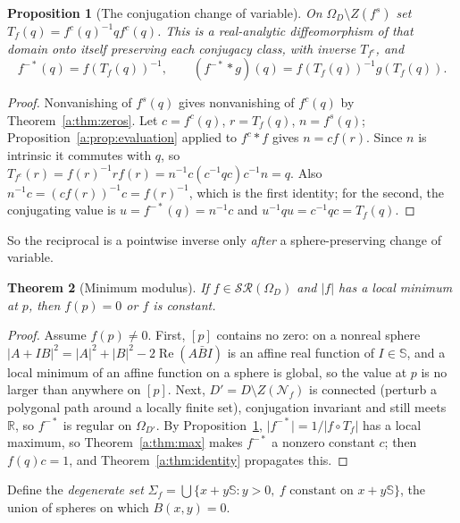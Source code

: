 \documentclass[11pt,a4paper]{article}
\numberwithin{equation}{section}
\newtheorem{theorem}{Theorem}[section]
\newtheorem{proposition}[theorem]{Proposition}
\theoremstyle{definition}
\theoremstyle{remark}
\theoremstyle{plain}
\newcommand{\RR}{\mathbb R}
\newcommand{\SSS}{\mathbb S}
\DeclareMathOperator{\Rea}{Re}
\newcommand{\SR}{\mathcal{SR}}
\newcommand{\Om}{\Omega}
\newcommand{\abs}[1]{\lvert #1\rvert}
\begin{document}
\begin{proposition}[The conjugation change of variable]
\label{a:prop:T}
On $\Om_D\setminus Z(f^s)$ set $T_f(q)=f^c(q)^{-1}qf^c(q)$. This is a
real-analytic diffeomorphism of that domain onto itself preserving each
conjugacy class, with inverse $T_{f^c}$, and
\begin{equation}
 f^{-*}(q)=f(T_f(q))^{-1},\qquad
 (f^{-*}*g)(q)=f(T_f(q))^{-1}g(T_f(q)).
 \label{a:eq:quotient-eval}
\end{equation}
\end{proposition}

\begin{proof}
Nonvanishing of $f^s(q)$ gives nonvanishing of $f^c(q)$ by
Theorem~\ref{a:thm:zeros}. Let $c=f^c(q)$, $r=T_f(q)$, $n=f^s(q)$;
Proposition~\ref{a:prop:evaluation} applied to $f^c*f$ gives $n=cf(r)$. Since
$n$ is intrinsic it commutes with $q$, so
$T_{f^c}(r)=f(r)^{-1}rf(r)=n^{-1}c(c^{-1}qc)c^{-1}n=q$. Also
$n^{-1}c=(cf(r))^{-1}c=f(r)^{-1}$, which is the first identity; for the
second, the conjugating value is $u=f^{-*}(q)=n^{-1}c$ and
$u^{-1}qu=c^{-1}qc=T_f(q)$.
\end{proof}

So the reciprocal is a pointwise inverse only \emph{after} a
sphere-preserving change of variable.

\begin{theorem}[Minimum modulus]
\label{a:thm:min}
If $f\in\SR(\Om_D)$ and $\abs f$ has a local minimum at $p$, then $f(p)=0$ or
$f$ is constant.
\end{theorem}

\begin{proof}
Assume $f(p)\ne0$. First, $[p]$ contains no zero: on a nonreal sphere
$\abs{A+IB}^2=\abs A^2+\abs B^2-2\Rea(A\bar BI)$ is an affine real function of
$I\in\SSS$, and a local minimum of an affine function on a sphere is global,
so the value at $p$ is no larger than anywhere on $[p]$. Next,
$D'=D\setminus Z(\mathcal N_f)$ is connected (perturb a polygonal path around
a locally finite set), conjugation invariant and still meets $\RR$, so
$f^{-*}$ is regular on $\Om_{D'}$. By Proposition~\ref{a:prop:T},
$\abs{f^{-*}}=1/\abs{f\circ T_f}$ has a local maximum, so
Theorem~\ref{a:thm:max} makes $f^{-*}$ a nonzero constant $c$; then
$f(q)c=1$, and Theorem~\ref{a:thm:identity} propagates this.
\end{proof}

Define the \emph{degenerate set}
$\Sigma_f=\bigcup\{x+y\SSS: y>0,\ f\text{ constant on }x+y\SSS\}$, the union
of spheres on which $B(x,y)=0$.
\end{document}
